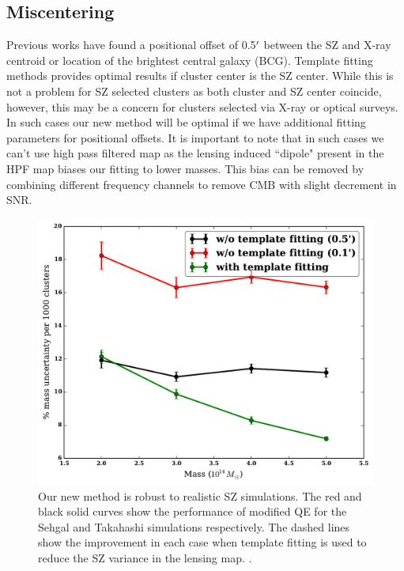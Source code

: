 {\subsection{Miscentering}
Previous works have found a positional offset of 0.5$^{\prime}$ between the SZ and X-ray centroid \citep{linden14} or location of the brightest central galaxy (BCG)\citep{song12b}.
Template fitting methods provides optimal results if cluster center is the SZ center.
While this is not a problem for SZ selected clusters as both cluster and SZ center coincide, however, this may be a concern for clusters selected via X-ray or optical surveys.
In such cases our new method will be optimal if we have additional fitting parameters for positional offsets.
It is important to note that in such cases we can't use high pass filtered map as the lensing induced ``dipole" present in the HPF map biases our fitting to lower masses. %
This bias can be removed by combining different frequency channels to remove CMB with slight decrement in SNR.
\begin{figure}[htb]
\includegraphics[width=\linewidth]{figs/miscentering_results.pdf}
 \caption{
Our new method is robust to realistic SZ simulations. 
The red and black solid curves show the performance of modified QE for the Sehgal and Takahashi simulations respectively. 
The dashed lines show the improvement in each case when template fitting is used to reduce the SZ variance in the lensing map. 
 .
 }
\label{fig:realistic_sims}
\end{figure}

}
